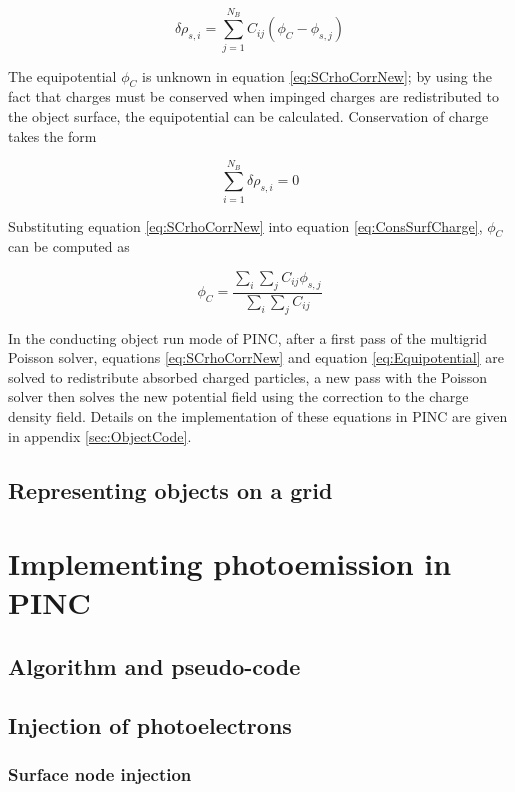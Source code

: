 \begin{equation}\label{eq:SCrhoCorrNew}
    \delta \rho_{s,i} = \sum^{N_B}_{j=1} C_{ij} (\phi_C - \phi_{s,j})
\end{equation}

The equipotential $\phi_C$ is unknown in equation \ref{eq:SCrhoCorrNew}; by using the fact that charges must be conserved when impinged charges are redistributed to the object surface, the equipotential can be calculated. Conservation of charge takes the form

\begin{equation}\label{eq:ConsSurfCharge}
    \sum^{N_B}_{i=1} \delta \rho_{s,i} = 0
\end{equation}

Substituting equation \ref{eq:SCrhoCorrNew} into equation \ref{eq:ConsSurfCharge}, $\phi_C$ can be computed as

\begin{equation}\label{eq:Equipotential}
    \phi_C = \frac{\sum_i \sum_j C_{ij} \phi_{s,j}}{\sum_i \sum_j C_{ij}}
\end{equation}

In the conducting object run mode of PINC, after a first pass of the multigrid Poisson solver, equations \ref{eq:SCrhoCorrNew} and equation \ref{eq:Equipotential} are solved to redistribute absorbed charged particles, a new pass with the Poisson solver then solves the new potential field using the correction to the charge density field. Details on the implementation of these equations in PINC are given in appendix \ref{sec:ObjectCode}.



\subsection{Representing objects on a grid}




\section{Implementing photoemission in PINC}
\subsection{Algorithm and pseudo-code}
\subsection{Injection of photoelectrons}
\subsubsection{Surface node injection}
